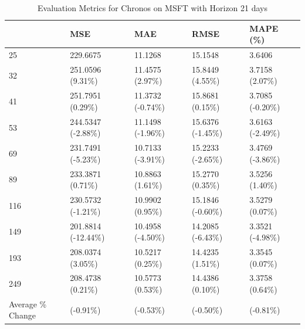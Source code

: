 \begin{table}
\caption{Evaluation Metrics for Chronos on MSFT with Horizon 21 days}
\label{tab:chronos_base_MSFT_h21_metrics}
\begin{tabular}{lllll}
\toprule
 & MSE & MAE & RMSE & MAPE (\%) \\
\midrule
25 & 229.6675 & 11.1268 & 15.1548 & 3.6406 \\
32 & 251.0596 (9.31\%) & 11.4575 (2.97\%) & 15.8449 (4.55\%) & 3.7158 (2.07\%) \\
41 & 251.7951 (0.29\%) & 11.3732 (-0.74\%) & 15.8681 (0.15\%) & 3.7085 (-0.20\%) \\
53 & 244.5347 (-2.88\%) & 11.1498 (-1.96\%) & 15.6376 (-1.45\%) & 3.6163 (-2.49\%) \\
69 & 231.7491 (-5.23\%) & 10.7133 (-3.91\%) & 15.2233 (-2.65\%) & 3.4769 (-3.86\%) \\
89 & 233.3871 (0.71\%) & 10.8863 (1.61\%) & 15.2770 (0.35\%) & 3.5256 (1.40\%) \\
116 & 230.5732 (-1.21\%) & 10.9902 (0.95\%) & 15.1846 (-0.60\%) & 3.5279 (0.07\%) \\
149 & 201.8814 (-12.44\%) & 10.4958 (-4.50\%) & 14.2085 (-6.43\%) & 3.3521 (-4.98\%) \\
193 & 208.0374 (3.05\%) & 10.5217 (0.25\%) & 14.4235 (1.51\%) & 3.3545 (0.07\%) \\
249 & 208.4738 (0.21\%) & 10.5773 (0.53\%) & 14.4386 (0.10\%) & 3.3758 (0.64\%) \\
Average \% Change & (-0.91\%) & (-0.53\%) & (-0.50\%) & (-0.81\%) \\
\bottomrule
\end{tabular}
\end{table}
